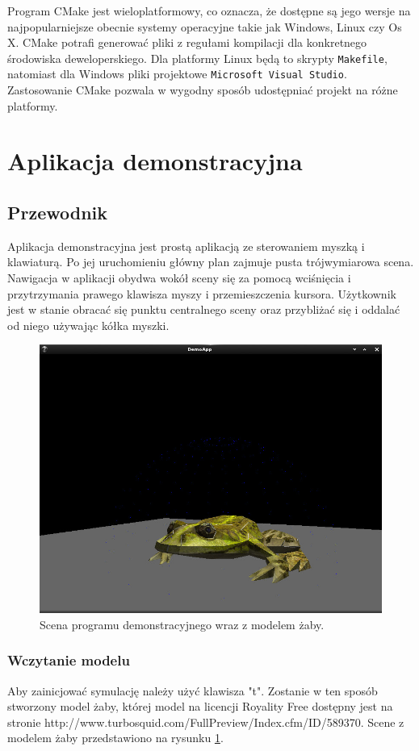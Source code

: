 Program CMake jest wieloplatformowy, co oznacza, że dostępne są jego wersje na
najpopularniejsze obecnie systemy operacyjne takie jak Windows, Linux czy Os X.
CMake potrafi generować pliki z regułami kompilacji dla konkretnego środowiska
deweloperskiego. Dla platformy Linux będą to skrypty \texttt{Makefile},
	natomiast dla Windows pliki projektowe \texttt{Microsoft Visual Studio}.
	Zastosowanie CMake pozwala w wygodny sposób udostępniać projekt na różne
	platformy.


\section{Aplikacja demonstracyjna}
\subsection{Przewodnik}
Aplikacja demonstracyjna jest prostą aplikacją ze sterowaniem myszką i
klawiaturą. Po jej uruchomieniu główny plan zajmuje pusta trójwymiarowa scena.
Nawigacja w aplikacji obydwa wokół sceny się za pomocą wciśnięcia i
przytrzymania prawego klawisza myszy i przemieszczenia kursora. Użytkownik jest
w stanie obracać się punktu centralnego sceny oraz przybliżać się i oddalać od
niego używając kółka myszki.

\begin{figure}[H]
\label{demo1}
\centering
\includegraphics[scale=0.5]{images/z1.jpg}
\caption{Scena programu demonstracyjnego wraz z modelem żaby.}
\end{figure}

\subsubsection{Wczytanie modelu}
Aby zainicjować symulację należy użyć klawisza "t". Zostanie w ten sposób
stworzony model żaby, której model na licencji Royality Free
dostępny jest na stronie http://www.turbosquid.com/FullPreview/Index.cfm/ID/589370.
Scene z modelem żaby przedstawiono na rysunku \ref{demo1}.

